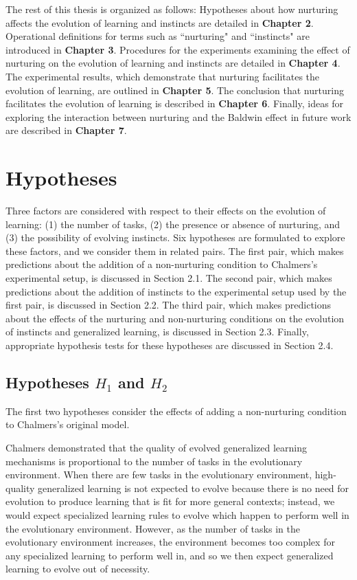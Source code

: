\documentclass[master]{outhesis}
\begin{document}
The rest of this thesis is organized as follows:
Hypotheses about how nurturing affects the evolution of learning and instincts are detailed in \textbf{Chapter 2}. 
Operational definitions for terms such as ``nurturing" and ``instincts" are introduced in \textbf{Chapter 3}.
Procedures for the experiments examining the effect of nurturing on the evolution of learning and instincts are detailed in \textbf{Chapter 4}.
The experimental results, which demonstrate that nurturing facilitates the evolution of learning, are outlined in \textbf{Chapter 5}. 
The conclusion that nurturing facilitates the evolution of learning is described in \textbf{Chapter 6}. 
Finally, ideas for exploring the interaction between nurturing and the Baldwin effect in future work are described in \textbf{Chapter 7}.

\chapter{Hypotheses}

Three factors are considered with respect to their effects on the evolution of learning:
(1) the number of tasks,
(2) the presence or absence of nurturing, and
(3) the possibility of evolving instincts.
Six hypotheses are formulated to explore these factors,
and we consider them in related pairs.
The first pair, which makes predictions about the addition of a non-nurturing condition to Chalmers's experimental setup, is discussed in Section 2.1.
The second pair, which makes predictions about the addition of instincts to the experimental setup used by the first pair, is discussed in Section 2.2.
The third pair, which makes predictions about the effects of the nurturing and non-nurturing conditions on the evolution of instincts and generalized learning, is discussed in Section 2.3.
Finally, appropriate hypothesis tests for these hypotheses are discussed in Section 2.4.

\section{Hypotheses $H_1$ and $H_2$}

The first two hypotheses consider the effects of adding a non-nurturing condition to Chalmers's original model.

Chalmers demonstrated that the quality of evolved generalized learning mechanisms is proportional to the number of tasks in the evolutionary environment. When there are few tasks in the evolutionary environment, high-quality generalized learning is not expected to evolve
because there is no need for evolution to produce learning that is fit for more general contexts;
instead, we would expect specialized learning rules to evolve which happen to perform well in the evolutionary environment.
However, as the number of tasks in the evolutionary environment increases,
the environment becomes too complex for any specialized learning to perform well in,
and so we then expect generalized learning to evolve out of necessity.
\end{document}
